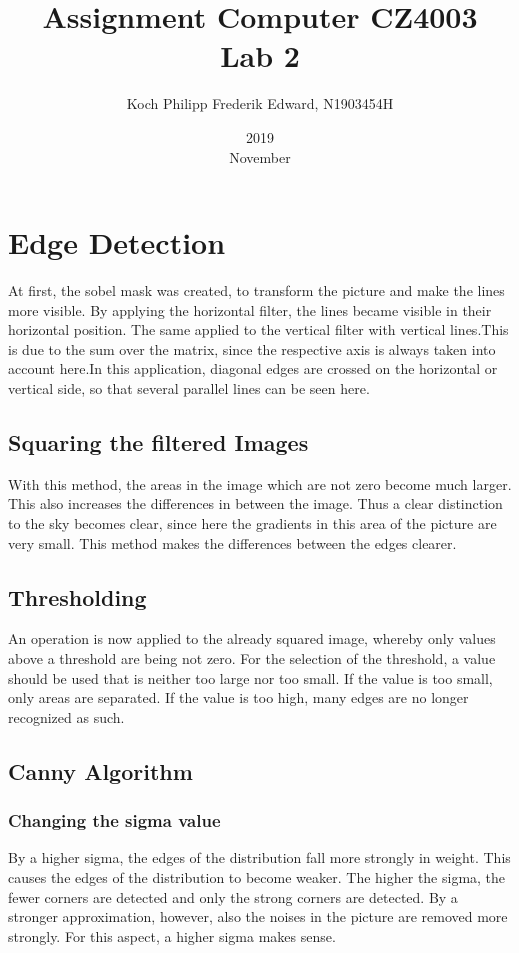 \documentclass{article}
\title{Assignment Computer CZ4003 \\ Lab 2}
\date{2019 \\ November}
\author{Koch Philipp Frederik Edward, N1903454H}
\begin{document}
	
	\maketitle
	
	\section{Edge Detection}

	At first, the sobel mask was created, to transform the picture and make the lines more visible.
	By applying the horizontal filter, the lines became visible in their horizontal position.
	The same applied to the vertical filter with vertical lines.This is due to the sum over the matrix, 
	since the respective axis is always taken into account here.In this application, 
	diagonal edges are crossed on the horizontal or vertical side, so that several parallel lines can be seen here.
	\subsection{Squaring the filtered Images}
	With this method, the areas in the image which are not zero become much larger. This also increases the differences in between the image.
	Thus a clear distinction to the sky becomes clear, since here the gradients in this area of the picture are very small. 
	This method makes the differences between the edges clearer.
	\subsection{Thresholding}
	An operation is now applied to the already squared image, whereby only values above a threshold are being not zero. 
	For the selection of the threshold, a value should be used that is neither too large nor too small. 
	If the value is too small, only areas are separated. If the value is too high, many edges are no longer recognized as such.
	\subsection{Canny Algorithm}
	\subsubsection{Changing the sigma value}
	By a higher sigma, the edges of the distribution fall more strongly in weight. This causes the edges of the distribution to become weaker. 
	The higher the sigma, the fewer corners are detected and only the strong corners are detected. By a stronger approximation, 
	however, also the noises in the picture are removed more strongly. For this aspect, a higher sigma makes sense.
\end{document}
